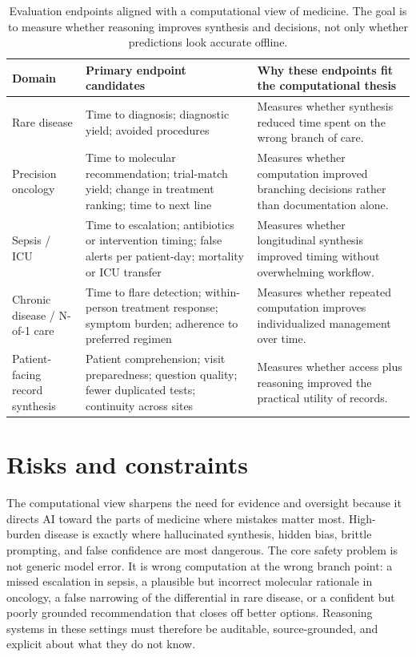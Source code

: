\documentclass[11pt]{article}
\begin{document}
\begin{table}[t]
\centering
\small
\renewcommand{\arraystretch}{1.14}
\setlength{\tabcolsep}{4.5pt}
\begin{tabularx}{\textwidth}{>{\raggedright\arraybackslash}p{3.0cm} >{\raggedright\arraybackslash}p{4.1cm} >{\raggedright\arraybackslash}X}
\toprule
\textbf{Domain} & \textbf{Primary endpoint candidates} & \textbf{Why these endpoints fit the computational thesis} \\
\midrule
Rare disease & Time to diagnosis; diagnostic yield; avoided procedures & Measures whether synthesis reduced time spent on the wrong branch of care. \\
Precision oncology & Time to molecular recommendation; trial-match yield; change in treatment ranking; time to next line & Measures whether computation improved branching decisions rather than documentation alone. \\
Sepsis / ICU & Time to escalation; antibiotics or intervention timing; false alerts per patient-day; mortality or ICU transfer & Measures whether longitudinal synthesis improved timing without overwhelming workflow. \\
Chronic disease / N-of-1 care & Time to flare detection; within-person treatment response; symptom burden; adherence to preferred regimen & Measures whether repeated computation improves individualized management over time. \\
Patient-facing record synthesis & Patient comprehension; visit preparedness; question quality; fewer duplicated tests; continuity across sites & Measures whether access plus reasoning improved the practical utility of records. \\
\bottomrule
\end{tabularx}
\caption{Evaluation endpoints aligned with a computational view of medicine. The goal is to measure whether reasoning improves synthesis and decisions, not only whether predictions look accurate offline.}
\label{tab:endpoints}
\end{table}

\section{Risks and constraints}
The computational view sharpens the need for evidence and oversight because it directs AI toward the parts of medicine where mistakes matter most. High-burden disease is exactly where hallucinated synthesis, hidden bias, brittle prompting, and false confidence are most dangerous. The core safety problem is not generic model error. It is wrong computation at the wrong branch point: a missed escalation in sepsis, a plausible but incorrect molecular rationale in oncology, a false narrowing of the differential in rare disease, or a confident but poorly grounded recommendation that closes off better options. Reasoning systems in these settings must therefore be auditable, source-grounded, and explicit about what they do not know.
\end{document}
